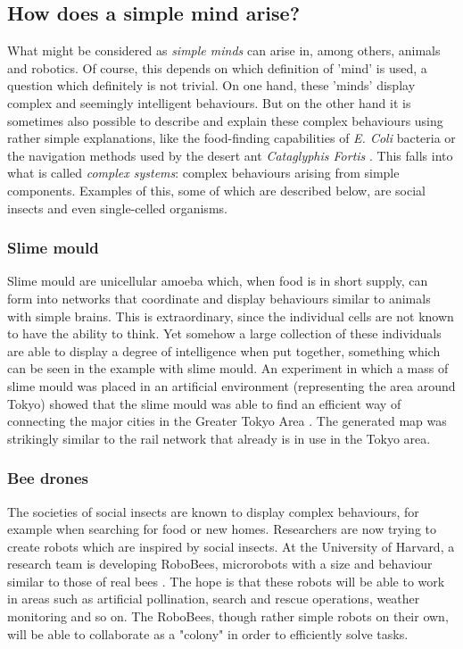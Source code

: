 \documentclass[11pt]{article}
\begin{document}
\subsection{How does a simple mind arise?}

What might be considered as \textit{simple minds} can arise in, among others, animals and robotics. Of course, this depends on which definition of 'mind' is used, a question which definitely is not trivial. On one hand, these 'minds' display complex and seemingly intelligent behaviours. But on the other hand it is sometimes also possible to describe and explain these complex behaviours using rather simple explanations, like the food-finding capabilities of \textit{E. Coli} bacteria or the navigation methods used by the desert ant \textit{Cataglyphis Fortis} \cite{wahde2015autonomous}. This falls into what is called \textit{complex systems}: complex behaviours arising from simple components. Examples of this, some of which are described below, are social insects and even single-celled organisms.

\subsubsection*{Slime mould}

Slime mould are unicellular amoeba which, when food is in short supply, can form into networks that coordinate and display behaviours similar to animals with simple brains. This is extraordinary, since the individual cells are not known to have the ability to think. Yet somehow a large collection of these individuals are able to display a degree of intelligence when put together, something which can be seen in the example with slime mould. An experiment in which a mass of slime mould was placed in an artificial environment (representing the area around Tokyo) showed that the slime mould was able to find an efficient way of connecting the major cities in the Greater Tokyo Area \cite{tero2010rules}. The generated map was strikingly similar to the rail network that already is in use in the Tokyo area.

\subsubsection*{Bee drones}

The societies of social insects are known to display complex behaviours, for example when searching for food or new homes. Researchers are now trying to create robots which are inspired by social insects. At the University of Harvard, a research team is developing RoboBees, microrobots with a size and behaviour similar to those of real bees \cite{robobees2015}. The hope is that these robots will be able to work in areas such as artificial pollination, search and rescue operations, weather monitoring and so on. The RoboBees, though rather simple robots on their own, will be able to collaborate as a "colony" in order to efficiently solve tasks. 
\end{document}
